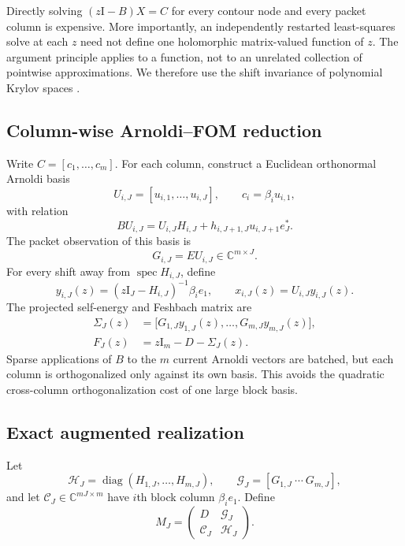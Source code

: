 \documentclass[11pt]{article}
\theoremstyle{definition}
\theoremstyle{remark}
\newcommand{\C}{\mathbb C}
\newcommand{\Id}{\mathrm I}
\newcommand{\cC}{\mathcal C}
\newcommand{\cG}{\mathcal G}
\newcommand{\cH}{\mathcal H}
\newcommand{\spec}{\operatorname{spec}}
\begin{document}
Directly solving $(z\Id-B)X=C$ for every contour node and every packet
column is expensive.  More importantly, an independently restarted
least-squares solve at each $z$ need not define one holomorphic matrix-valued
function of $z$.  The argument principle applies to a function, not to an
unrelated collection of pointwise approximations.  We therefore use the
shift invariance of polynomial Krylov spaces \citep{Saad1980,Saad2003}.

\subsection{Column-wise Arnoldi--FOM reduction}

Write $C=[c_1,\ldots,c_m]$.  For each column, construct a Euclidean
orthonormal Arnoldi basis
\[
 U_{i,J}=[u_{i,1},\ldots,u_{i,J}],
 \qquad c_i=\beta_i u_{i,1},
\]
with relation
\begin{equation}
 B U_{i,J}
 =U_{i,J}H_{i,J}
  +h_{i,J+1,J}u_{i,J+1}e_J^*.
 \label{eq:arnoldi-relation}
\end{equation}
The packet observation of this basis is
\[
 G_{i,J}=E U_{i,J}\in\C^{m\times J}.
\]
For every shift away from $\spec H_{i,J}$, define
\begin{equation}
 y_{i,J}(z)=(z\Id_J-H_{i,J})^{-1}\beta_i e_1,
 \qquad
 x_{i,J}(z)=U_{i,J}y_{i,J}(z).
 \label{eq:fom-solution}
\end{equation}
The projected self-energy and Feshbach matrix are
\begin{align}
 \Sigma_J(z)
 &=\bigl[G_{1,J}y_{1,J}(z),\ldots,G_{m,J}y_{m,J}(z)\bigr],
 \label{eq:projected-self-energy}\\
 F_J(z)&=z\Id_m-D-\Sigma_J(z).
 \label{eq:projected-feshbach}
\end{align}
Sparse applications of $B$ to the $m$ current Arnoldi vectors are batched,
but each column is orthogonalized only against its own basis.  This avoids
the quadratic cross-column orthogonalization cost of one large block basis.

\subsection{Exact augmented realization}

Let
\[
 \cH_J=\operatorname{diag}(H_{1,J},\ldots,H_{m,J}),
 \qquad
 \cG_J=[G_{1,J}\ \cdots\ G_{m,J}],
\]
and let $\cC_J\in\C^{mJ\times m}$ have $i$th block column
$\beta_i e_1$.  Define
\begin{equation}
 M_J=
 \begin{pmatrix}
  D&\cG_J\\
  \cC_J&\cH_J
 \end{pmatrix}.
 \label{eq:augmented-matrix}
\end{equation}
\end{document}
